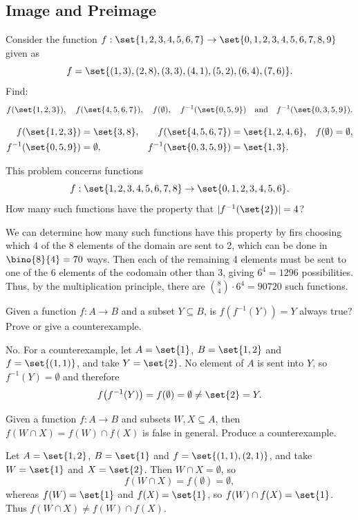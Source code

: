 \documentclass[DIN, pagenumber=false, fontsize=11pt, parskip=half]{scrartcl}
\begin{document}
\subsection{Image and Preimage}

\begin{problems}
    \problem Consider the function $f : \set{1,2,3,4,5,6,7} \to \set{0,1,2,3,4,5,6,7,8,9}$ given as
    \[
        f = \set{(1,3),(2,8),(3,3),(4,1),(5,2),(6,4),(7,6)}.
    \]
    Find:
    \[
        f(\set{1,2,3}), \quad f(\set{4,5,6,7}), \quad f(\emptyset), \quad f^{-1}(\set{0,5,9}) \quad \text{and} \quad f^{-1}(\set{0,3,5,9}).
    \]

    \answer
    \begin{align*}
        f(\set{1,2,3}) &= \set{3,8}, & f(\set{4,5,6,7}) &= \set{1,2,4,6}, & f(\emptyset) &= \emptyset,\\
        f^{-1}(\set{0,5,9}) &= \emptyset, & f^{-1}(\set{0,3,5,9}) &= \set{1,3}. &&
    \end{align*}

    \problem This problem concerns functions
    \[
        f : \set{1,2,3,4,5,6,7,8} \to \set{0,1,2,3,4,5,6}.
    \]
    How many such functions have the property that $\abs{f^{-1}(\set{2})} = 4$?

    \answer We can determine how many such functions have this property by firs choosing which 4 of the 8 elements of the domain are sent to 2, which can be done in $\bino{8}{4} = 70$ ways. 
    Then each of the remaining 4 elements must be sent to one of the 6 elements of the codomain other than 3, giving $6^4 = 1296$ possibilities.
    Thus, by the multiplication principle, there are $\binom{8}{4} \cdot 6^4 = 90720$ such functions.

    \problem Given a function $f : A \to B$ and a subset $Y \subseteq B$, is $f(f^{-1}(Y)) = Y$ always true? Prove or give a counterexample.

    \answer No. For a counterexample, let $A = \set{1}$, $B = \set{1,2}$ and $f = \set{(1,1)}$, and take $Y = \set{2}$. No element of $A$ is sent into $Y$, so $f^{-1}(Y) = \emptyset$ and therefore
    \[
        f\big(f^{-1}(Y)\big) = f(\emptyset) = \emptyset \neq \set{2} = Y.
    \]

    \problem Given a function $f : A \to B$ and subsets $W, X \subseteq A$, then $f(W \cap X) = f(W) \cap f(X)$ is false in general. Produce a counterexample.

    \answer Let $A = \set{1,2}$, $B = \set{1}$ and $f = \set{(1,1),(2,1)}$, and take $W = \set{1}$ and $X = \set{2}$. Then $W \cap X = \emptyset$, so
    \[
        f(W \cap X) = f(\emptyset) = \emptyset,
    \]
    whereas $f(W) = \set{1}$ and $f(X) = \set{1}$, so $f(W) \cap f(X) = \set{1}$. Thus $f(W \cap X) \neq f(W) \cap f(X)$.


\end{problems}
\end{document}
